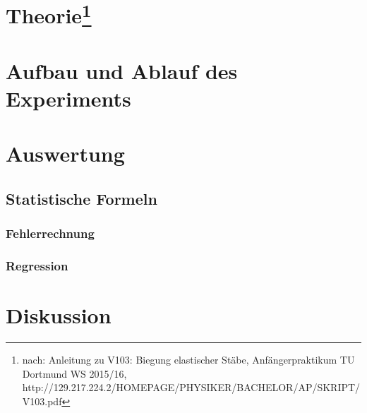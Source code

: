 \documentclass[a4,12pt]{article}
\begin{document}



\newpage
	\tableofcontents
\newpage

	\section[Theorie]{Theorie\footnote{nach: Anleitung zu V103: Biegung elastischer Stäbe, Anfängerpraktikum TU Dortmund WS 2015/16, http://129.217.224.2/HOMEPAGE/PHYSIKER/BACHELOR/AP/SKRIPT/V103.pdf}}
	
\newpage

	\section{Aufbau und Ablauf des Experiments}
	
\newpage

	\section{Auswertung}
	\subsection{Statistische Formeln}
	\subsubsection{Fehlerrechnung}
	
	\subsubsection{Regression}
	\label{sec:regression}
	
	
\newpage

	\section{Diskussion}
	
\end{document}
